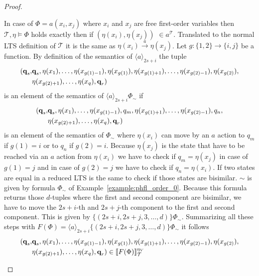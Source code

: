 \begin{proof}
\begin{compactitem}
        \item In case of $\Phi = a(x_i, x_j)$ where $x_i$ and $x_j$ are free first-order variables then $\mathcal{T}, \eta \models \Phi$ holds exactly then if $(\eta(x_i)
        , \eta(x_j))$ $ \in a^\mathcal{T}$. Translated to the normal LTS definition of $\mathcal{T}$ it is the same as $
        \eta(x_i) \overset{a}{\rightarrow} \eta(x_j)$. Let $g: \{1, 2\} \rightarrow \{i, j\}$ be a function.
        By  definition of the semantics of $\langle a \rangle_{2s+i}$ the tuple
        \begin{align*}
            (\emph{q}_s, &\emph{q}_s, \eta(x_1), \dots, \eta(x_{g(1) - 1}), \eta(x_{g(1)}), \eta(x_{g(1)+1}), \dots, \eta(x_{g(2)-1}), \eta
            (x_{g(2)}),\\& \eta(x_{g(2)+1}), \dots, \eta(x_q), \emph{q}_r)
        \end{align*}
        is an element of the semantics of $\langle a \rangle_{2s+i} \Phi_\sim$ if
        \begin{align*}
            (\emph{q}_s, &\emph{q}_s, \eta(x_1), \dots, \eta(x_{g(1) - 1}), q_m, \eta(x_{g(1)+1}), \dots, \eta(x_{g(2)-1}), q_n,\\& \eta(x_{g(2)
            +1}), \dots, \eta(x_q), \emph{q}_r)
        \end{align*}
        is an element of the semantics of $\Phi_\sim$ where $\eta(x_i)$ can
        move by an $a$ action to $q_m$ if $g(1) = i$ or to $q_n$ if $g(2) = i$. Because $\eta(x_j)$ is the state that
        have to be reached via an $a$ action from $\eta(x_i)$ we have to check if $q_m = \eta(x_j)$ in case of $g(1)
        = j$ and in case of $g(2) = j$ we have to check if $q_n = \eta(x_i)$. If two states are equal in a reduced LTS is
        the same to check if those states are bisimilar. $\sim$ is given by formula $\Phi_\sim$ of
        Example~\ref{example:phfl_order_0}.
        Because this formula returns those $d$-tuples where the first and second component are bisimilar, we have to
        move the $2s+i$-th and $2s+j$-th component to the first and second component. This is given by $\{(2s+i, 2s+j, 3, \dots, d
        )\} \Phi_\sim$. Summarizing all these steps with $F(\Phi) = \langle a \rangle_{2s+i} \{(2s+i, 2s+j, 3, \dots, d)\}
        \Phi_\sim$ it follows
        \begin{align*}
            (\emph{q}_s, &\emph{q}_s, \eta(x_1), \dots, \eta(x_{g(1) - 1}), \eta(x_{g(1)}), \eta(x_{g(1)+1}), \dots, \eta(x_{g(2)-1}), \eta
            (x_{g(2)}),\\& \eta(x_{g(2)+1}), \dots, \eta(x_q), \emph{q}_r) \in \llbracket F(\Phi) \rrbracket^{\eta_V}_\mathcal{T}

\end{align*}
\end{compactitem}
\end{proof}
